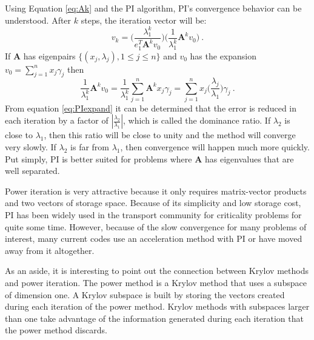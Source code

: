 \documentclass[12pt]{article}
\newcommand{\ve}[1]{\ensuremath{\mathbf{#1}}}
\begin{document}
Using Equation \eqref{eq:Ak} and the PI algorithm, PI's convergence behavior can be understood. After $k$ steps, the iteration vector will be: 
%
\begin{equation}
  v_{k} = \bigl( \frac{\lambda_{1}^{k}}{e_{1}^{T}\ve{A}^{k}v_{0}} \bigr) \bigl(\frac{1}{\lambda_{1}^{k}}\ve{A}^{k}v_{0} \bigr) \:.
\end{equation}
% 
If $\ve{A}$ has eigenpairs $\{(x_{j}, \lambda_{j}), 1 \le j \le n \}$ and $v_{0}$ has the expansion $v_{0} = \sum_{j=1}^{n} x_{j}\gamma_{j}$ then
%
\begin{equation}
  \frac{1}{\lambda_{1}^{k}}\ve{A}^{k}v_{0} =  \frac{1}{\lambda_{1}^{k}} \sum_{j=1}^{n} \ve{A}^{k}x_{j}\gamma_{j} = \sum_{j=1}^{n} x_{j} \bigl(\frac{\lambda_{j}}{\lambda_{1}} \bigr) \gamma_{j} \:.
  \label{eq:PIexpand}
\end{equation}
%
From equation \eqref{eq:PIexpand} it can be determined that the error is reduced in each iteration by a factor of $|\frac{\lambda_{2}}{\lambda_{1}}|$, which is called the dominance ratio. If $\lambda_2$ is close to $\lambda_1$, then this ratio will be close to unity and the method will converge very slowly. If $\lambda_2$ is far from $\lambda_1$, then convergence will happen much more quickly. Put simply, PI is better suited for problems where $\ve{A}$ has eigenvalues that are well separated.%

Power iteration is very attractive because it only requires matrix-vector products and two vectors of storage space. Because of its simplicity and low storage cost, PI has been widely used in the transport community for criticality problems for quite some time. %
However, because of the slow convergence for many problems of interest, many current codes use an acceleration method with PI or have moved away from it altogether. 

As an aside, it is interesting to point out the connection between Krylov methods and power iteration. The power method is a Krylov method that uses a subspace of dimension one.  A Krylov subspace is built by storing the vectors created during each iteration of the power method. Krylov methods with subspaces larger than one take advantage of the information generated during each iteration that the power method discards. 
\end{document}
